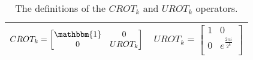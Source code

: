 \begin{table}[!hbt]
  \centering
  \begin{tabular}{|c|c|}
    \hline
    $CROT_k=
    \begin{bmatrix}
      \mathbbm{1}& 0 \\
      0 & UROT_k\\
    \end{bmatrix}
    $ & 
    $UROT_k = 
    \begin{bmatrix}
      1 & 0 \\
      0 & e^{\frac{2\pi i}{2^k}}\\
    \end{bmatrix}
    $\\
    \hline
  \end{tabular}
  \caption{The definitions of the $CROT_k$ and $UROT_k$ operators.}
  \label{table:qft_crot_urot}
\end{table}

